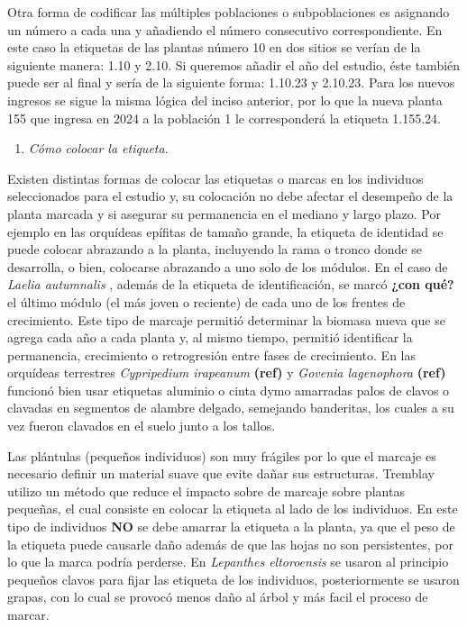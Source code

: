 \documentclass[
]{book}
\providecommand{\tightlist}{%
  \setlength{\itemsep}{0pt}\setlength{\parskip}{0pt}}
\theoremstyle{definition}
\theoremstyle{definition}
\theoremstyle{definition}
\theoremstyle{definition}
\theoremstyle{remark}
\begin{document}
Otra forma de codificar las múltiples poblaciones o subpoblaciones es asignando un número a cada una y añadiendo el número consecutivo correspondiente.
En este caso la etiquetas de las plantas número 10 en dos sitios se verían de la siguiente manera: 1.10 y 2.10.
Si queremos añadir el año del estudio, éste también puede ser al final y sería de la siguiente forma: 1.10.23 y 2.10.23.
Para los nuevos ingresos se sigue la misma lógica del inciso anterior, por lo que la nueva planta 155 que ingresa en 2024 a la población 1 le corresponderá la etiqueta 1.155.24.

\begin{enumerate}
\def\labelenumi{\alph{enumi})}
\setcounter{enumi}{2}
\tightlist
\item
  \emph{Cómo colocar la etiqueta}.
\end{enumerate}

Existen distintas formas de colocar las etiquetas o marcas en los individuos seleccionados para el estudio y, su colocación no debe afectar el desempeño de la planta marcada y si asegurar su permanencia en el mediano y largo plazo.
Por ejemplo en las orquídeas epífitas de tamaño grande, la etiqueta de identidad se puede colocar abrazando a la planta, incluyendo la rama o tronco donde se desarrolla, o bien, colocarse abrazando a uno solo de los módulos.
En el caso de \emph{Laelia autumnalis} \citep{emeterio2021does}, además de la etiqueta de identificación, se marcó \textbf{¿con qué?} el último módulo (el más joven o reciente) de cada uno de los frentes de crecimiento.
Este tipo de marcaje permitió determinar la biomasa nueva que se agrega cada año a cada planta y, al mismo tiempo, permitió identificar la permanencia, crecimiento o retrogresión entre fases de crecimiento.
En las orquídeas terrestres \emph{Cypripedium irapeanum} \textbf{(ref)} y \emph{Govenia lagenophora} \textbf{(ref)} funcionó bien usar etiquetas aluminio o cinta dymo amarradas palos de clavos o clavadas en segmentos de alambre delgado, semejando banderitas, los cuales a su vez fueron clavados en el suelo junto a los tallos.

Las plántulas (pequeños individuos) son muy frágiles por lo que el marcaje es necesario definir un material suave que evite dañar sus estructuras.
Tremblay \citetext{\citealp{tremblay2000plant}; \citealp[ ]{tremblay2003population}; \citealp{tremblay1997lepanthes}} utilizo un método que reduce el impacto sobre de marcaje sobre plantas pequeñas, el cual consiste en colocar la etiqueta al lado de los individuos.
En este tipo de individuos \textbf{NO} se debe amarrar la etiqueta a la planta, ya que el peso de la etiqueta puede causarle daño además de que las hojas no son persistentes, por lo que la marca podría perderse.
En \emph{Lepanthes eltoroensis} se usaron al principio pequeños clavos para fijar las etiqueta de los individuos, posteriormente se usaron grapas, con lo cual se provocó menos daño al árbol y más facil el proceso de marcar.
\end{document}
